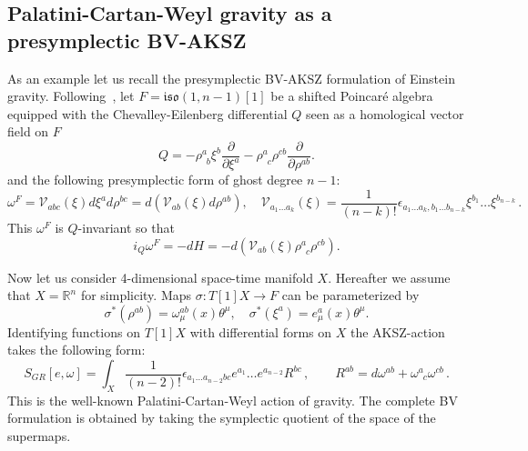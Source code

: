 \documentclass[a4paper,12pt]{article}
\numberwithin{equation}{section} %
\numberwithin{equation}{section}
\renewcommand{\wedge}{}
\newcommand{\atheta}{\theta}
\begin{document}

\subsection{Palatini-Cartan-Weyl gravity as a presymplectic BV-AKSZ}
\label{pAKSZ-Gravity}

As an example let us recall the presymplectic BV-AKSZ formulation of Einstein gravity.
Following~\cite{Grigoriev:2020xec,Alkalaev:2013hta}, let $F = \mathfrak{iso}(1,n-1)[1]$ be a shifted Poincar\'e algebra equipped with the Chevalley-Eilenberg differential $Q$ seen as a homological vector field on $F$
\begin{equation}
    Q = -\rho^a_{\enspace b} \xi^b \frac{\partial}{\partial \xi^a} - \rho^a_{\enspace c}\rho^{cb} \frac{\partial}{\partial \rho^{ab}}.
\end{equation}
and the following presymplectic form of ghost degree $n-1$:
\begin{equation}
    \omega^F = \mathcal{V}_{abc}(\xi)d\xi^a \wedge d\rho^{bc} = d(\mathcal{V}_{ab}(\xi)d\rho^{ab}), \quad \mathcal{V}_{a_1\dots a_k}(\xi) = \frac{1}{(n-k)!}\epsilon_{a_1 \dots a_k, b_1 \dots b_{n-k}} \xi^{b_1}\dots \xi^{b_{n-k}}\,.
\end{equation}
This $\omega^F$ is $Q$-invariant so that
\begin{equation}
    i_Q \omega^F = -dH = -d(\mathcal{V}_{ab}(\xi) \rho^a_{\enspace c} \rho^{cb}).
\end{equation}

Now let us consider 4-dimensional space-time manifold $X$. Hereafter we assume that $X = \mathbb{R}^n$  for simplicity. Maps $\sigma: T[1]X \to F$ can be parameterized by
\begin{equation}
    \sigma^\ast (\rho^{ab}) = \omega^{ab}_{\mu}(x)\atheta^\mu, \quad \sigma^\ast (\xi^a) = e^a_{\mu}(x)\atheta^\mu.
\end{equation}
Identifying functions on $T[1]X$ with differential forms on $X$ the AKSZ-action takes the following form:
\begin{equation}
    S_{GR}[e,\omega] = \int_X \frac{1}{(n-2)!}\epsilon_{a_1 \dots a_{n-2}bc} e^{a_1} \wedge \dots e^{a_{n-2}}R^{bc}\,,\qquad R^{ab}=d\omega^{ab}+\omega^a_{\enspace c}\omega^{cb}\,.
\end{equation}
This is the well-known Palatini-Cartan-Weyl action of gravity. The complete BV formulation is obtained by taking the symplectic quotient of the space of the supermaps. 
\end{document}
